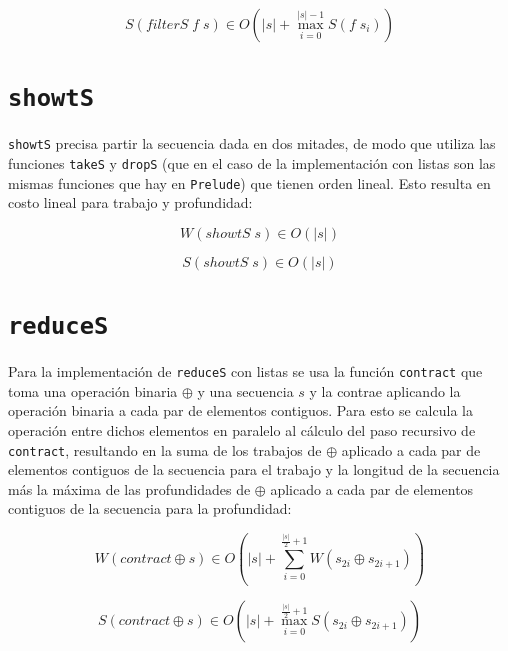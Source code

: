 \documentclass[a4paper,10pt]{article}
\begin{document}
\begin{equation*}
    S \left( filterS\; f \; s \right) \in
    O \left( \vert s \vert + \max_{i=0}^{\vert s \vert -1} S \left( f \; s_i \right) \right)
\end{equation*}


\section*{\texttt{showtS}}

\texttt{showtS} precisa partir la secuencia dada en dos mitades, de modo que
utiliza las funciones \texttt{takeS} y \texttt{dropS} (que en el caso de la
implementación con listas son las mismas funciones que hay en \texttt{Prelude})
que tienen orden lineal. Esto resulta en costo lineal para trabajo y profundidad:

\begin{equation*}
    W \left( showtS \; s \right) \in
    O \left( \vert s \vert \right)
\end{equation*}

\begin{equation*}
    S \left( showtS \; s \right) \in
    O \left( \vert s \vert \right)
\end{equation*}


\section*{\texttt{reduceS}}

Para la implementación de \texttt{reduceS} con listas se usa la función \texttt{contract}
que toma una operación binaria $\oplus$ y una secuencia $s$ y la contrae aplicando
la operación binaria a cada par de elementos contiguos. Para esto se calcula la
operación entre dichos elementos en paralelo al cálculo del paso recursivo de
\texttt{contract}, resultando en la suma de los trabajos de $\oplus$ aplicado a
cada par de elementos contiguos de la secuencia para el trabajo y la longitud de
la secuencia más la máxima de las profundidades de $\oplus$ aplicado a cada par de
elementos contiguos de la secuencia para la profundidad:

\begin{equation*}
    W \left( contract \oplus s \right) \in
    O \left( \vert s \vert + \sum_{i=0}^{\frac{\vert s \vert}{2} + 1} W \left( s_{2i} \oplus s_{2i+1} \right) \right)
\end{equation*}

\begin{equation*}
    S \left( contract \oplus s \right) \in
    O \left( \vert s \vert + \max_{i=0}^{\frac{\vert s \vert}{2} + 1} S \left( s_{2i} \oplus s_{2i+1} \right) \right)
\end{equation*}
\end{document}
